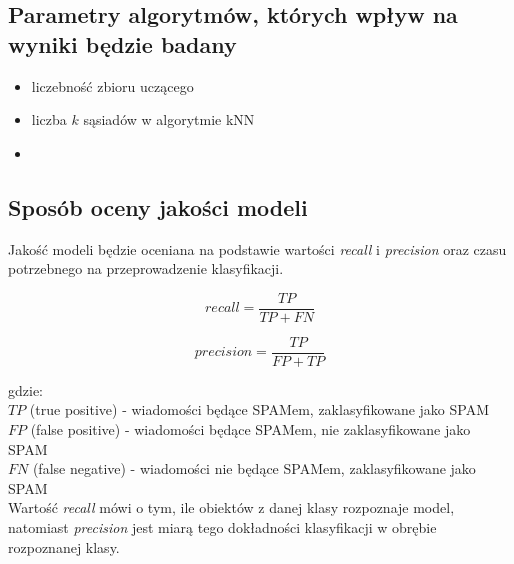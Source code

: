 \documentclass[a4paper, 10pt]{article}
\begin{document}

\subsection{Parametry algorytmów, których wpływ na wyniki będzie badany}

\begin{itemize}
\item{liczebność zbioru uczącego}
\item{liczba $k$ sąsiadów w algorytmie kNN}
\item{%
}
\end{itemize}


\subsection{Sposób oceny jakości modeli}

Jakość modeli będzie oceniana na podstawie wartości \textit{recall} i \textit{precision} oraz czasu potrzebnego na przeprowadzenie klasyfikacji.

\begin{equation}
recall = \frac{TP}{TP + FN}
\end{equation}

\begin{equation}
precision = \frac{TP}{FP + TP}
\end{equation}

gdzie:\\
$TP$ (true positive) - wiadomości będące SPAMem, zaklasyfikowane jako SPAM\\
$FP$ (false positive) - wiadomości będące SPAMem, nie zaklasyfikowane jako SPAM\\
$FN$ (false negative) - wiadomości nie będące SPAMem, zaklasyfikowane jako SPAM\\

Wartość \textit{recall} mówi o tym, ile obiektów z danej klasy rozpoznaje model, natomiast \textit{precision} jest miarą tego dokładności klasyfikacji w obrębie rozpoznanej klasy.

\nocite{*}

\end{document}
